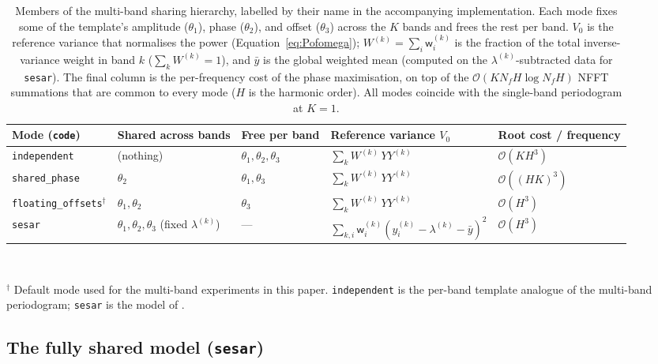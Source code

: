 \documentclass[apj]{emulateapj}
\newcommand{\bigO}{\mathcal{O}}
\newcommand{\wgt}{\mathsf{w}}  %
\newcommand{\ybar}{\bar{y}}
\newcommand{\wk}[1][k]{\wgt^{(#1)}}
\newcommand{\yk}[1][k]{y^{(#1)}}
\newcommand{\lk}[1][k]{\lambda^{(#1)}}
\newcommand{\Wtk}[1][k]{W^{(#1)}}
\begin{document}
\begin{appendix}
\begin{table}
\centering
\caption{\label{tab:sharingmodes}
Members of the multi-band sharing hierarchy, labelled by their name in the
accompanying implementation. Each mode fixes some of the template's
amplitude ($\theta_1$), phase ($\theta_2$), and offset ($\theta_3$) across
the $K$ bands and frees the rest per band. $V_0$ is the reference variance
that normalises the power (Equation~\ref{eq:Pofomega}); $\Wtk = \sum_i \wk_i$
is the fraction of the total inverse-variance weight in band $k$
($\sum_k \Wtk = 1$), and $\ybar$ is the global weighted mean (computed on the $\lk$-subtracted data for \texttt{sesar}). The final
column is the per-frequency cost of the phase maximisation, on top of the
$\bigO(KN_fH\log N_fH)$ NFFT summations that are common to every mode ($H$
is the harmonic order). All modes coincide with the single-band periodogram
at $K=1$.}
\footnotesize
\begin{tabular}{lllll}
\hline\hline
Mode (\texttt{code}) & Shared across bands & Free per band & Reference variance $V_0$ & Root cost / frequency \\
\hline
\texttt{independent}                    & (nothing)                                  & $\theta_1,\theta_2,\theta_3$ & $\sum_k \Wtk\, YY^{(k)}$          & $\bigO(KH^3)$ \\
\texttt{shared\_phase}                  & $\theta_2$                                 & $\theta_1,\theta_3$          & $\sum_k \Wtk\, YY^{(k)}$          & $\bigO((HK)^3)$ \\
\texttt{floating\_offsets}$^{\dagger}$  & $\theta_1,\theta_2$                        & $\theta_3$                   & $\sum_k \Wtk\, YY^{(k)}$          & $\bigO(H^3)$ \\
\texttt{sesar}                          & $\theta_1,\theta_2,\theta_3$ (fixed $\lk$) & ---                          & $\sum_{k,i}\wk_i(\yk_i-\lk-\ybar)^2$  & $\bigO(H^3)$ \\
\hline
\end{tabular}
\\[3pt]
{\raggedright\footnotesize $^{\dagger}$ Default mode used for the multi-band
experiments in this paper. \texttt{independent} is the per-band template
analogue of the \cite{Vanderplas+Ivezic_2015} multi-band periodogram;
\texttt{sesar} is the model of \cite{Sesar_etal_2016}.\par}
\end{table}

\subsection{The fully shared model (\texttt{sesar})}
\label{app:sesarmode}


\end{appendix}
\end{document}
